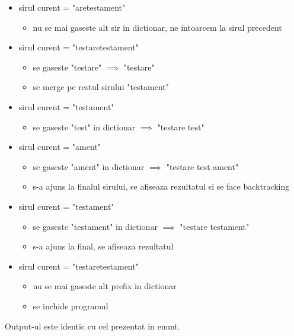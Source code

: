 \documentclass[runningheads]{llncs}
\begin{document}
\begin{itemize}
	\item sirul curent = "aretestament"
	\begin{itemize}
		\setlength\itemsep{0em}
		\item nu se mai gaseste alt sir in dictionar, ne intoarcem la sirul precedent
	\end{itemize}
	
	\item sirul curent = "testaretestament"
	\begin{itemize}
		\setlength\itemsep{0em}
		\item se gaseste "testare" $\implies$ "testare"
		\item se merge pe restul sirului "testament"
	\end{itemize}
	
	\item sirul curent = "testament"
	\begin{itemize}
		\setlength\itemsep{0em}
		\item se gaseste "test" in dictionar $\implies$ "testare test"
	\end{itemize}

	\item sirul curent = "ament"
	\begin{itemize}
		\setlength\itemsep{0em}
		\item se gaseste "ament" in dictionar $\implies$ "testare test ament"
		\item s-a ajuns la finalul sirului, se afiseaza rezultatul si se face backtracking
	\end{itemize}
	
	\item sirul curent = "testament"
	\begin{itemize}
		\setlength\itemsep{0em}
		\item se gaseste "testament" in dictionar $\implies$ "testare testament"
		\item s-a ajuns la final, se afiseaza rezultatul
	\end{itemize}

	\item sirul curent = "testaretestament"
	\begin{itemize}
		\setlength\itemsep{0em}
		\item nu se mai gaseste alt prefix in dictionar
		\item se inchide programul
	\end{itemize}
\end{itemize}

Output-ul este identic cu cel prezentat in enunt.
\end{document}
